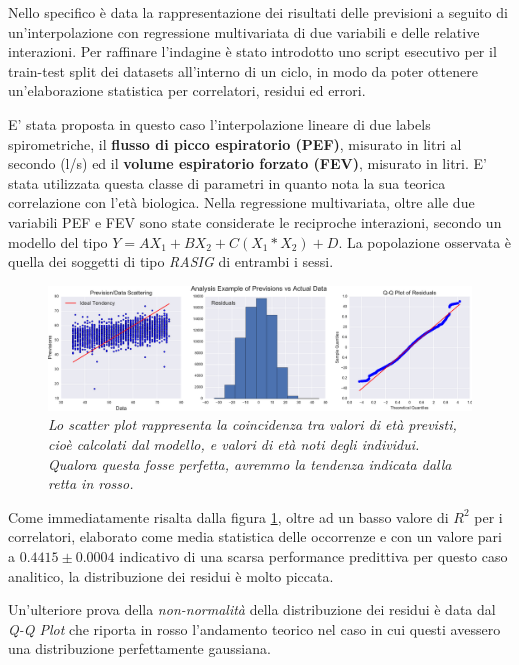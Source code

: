 \documentclass[12pt,openright,twoside,a4paper]{book}
\begin{document}
Nello specifico è data la rappresentazione dei risultati delle previsioni a seguito di un'interpolazione con regressione multivariata di due variabili e delle relative interazioni.
Per raffinare l'indagine è stato introdotto uno script esecutivo per il train-test split dei datasets all'interno di un ciclo, in modo da poter ottenere un'elaborazione statistica per correlatori, residui ed errori.

E' stata proposta in questo caso l'interpolazione lineare di due labels spirometriche, il \textbf{flusso di picco espiratorio (PEF)}, misurato in litri al secondo (l/s) ed il \textbf{volume espiratorio forzato (FEV)}, misurato in litri.
E' stata utilizzata questa classe di parametri in quanto nota la sua teorica correlazione con l'età biologica.
Nella regressione multivariata, oltre alle due variabili PEF e FEV sono state considerate le reciproche interazioni, secondo un modello del tipo $Y=AX_1+BX_2+C(X_1*X_2)+D$.
La popolazione osservata è quella dei soggetti di tipo \textit{RASIG} di entrambi i sessi.

\begin{figure}[!h]
\centering
\includegraphics[width=1.2\linewidth]{mulregression}
\caption{\textit{Lo scatter plot rappresenta la coincidenza tra valori di età previsti, cioè calcolati dal modello, e valori di età noti degli individui. Qualora questa fosse perfetta, avremmo la tendenza indicata dalla retta in rosso.}}
\label{mulregression}
\end{figure}

Come immediatamente risalta dalla figura \ref{mulregression}, oltre ad un basso valore di $R^2$ per i correlatori, elaborato come media statistica delle occorrenze e con un valore pari a $0.4415\pm0.0004$ indicativo di una scarsa performance predittiva per questo caso analitico, la distribuzione dei residui è molto piccata.

Un'ulteriore prova della \textit{non-normalità } della distribuzione dei residui è data dal \textit{Q-Q Plot} che riporta in rosso l'andamento teorico nel caso in cui questi avessero una distribuzione perfettamente gaussiana.
\end{document}
